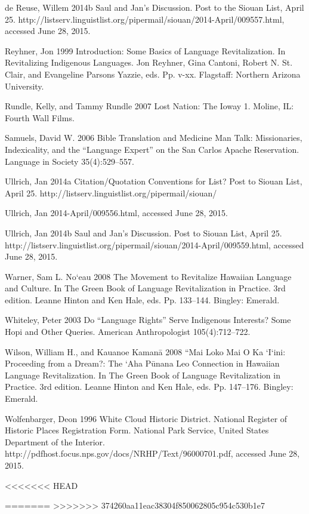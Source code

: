 \documentclass[output=paper]{LSP/langsci}
\begin{document}
\begin{reflist}
de Reuse, Willem 2014b Saul and Jan's Discussion. Post to the Siouan List, April 25. http://listserv.linguistlist.org/pipermail/siouan/2014-April/009557.html, accessed June 28, 2015.

Reyhner, Jon 1999 Introduction: Some Basics of Language Revitalization. In Revitalizing Indigenous Languages. Jon Reyhner, Gina Cantoni, Robert N. St. Clair, and Evangeline Parsons Yazzie, eds. Pp. v-xx. Flagstaff: Northern Arizona University.

Rundle, Kelly, and Tammy Rundle 2007 Lost Nation: The Ioway 1. Moline, IL: Fourth Wall Films.

Samuels, David W. 2006 Bible Translation and Medicine Man Talk: Missionaries, Indexicality, and the ``Language Expert'' on the San Carlos Apache Reservation. Language in Society 35(4):529--557.

Ullrich, Jan 2014a Citation/Quotation Conventions for List? Post to Siouan List, April 25. http://listserv.linguistlist.org/pipermail/siouan/

Ullrich, Jan 2014-April/009556.html, accessed June 28, 2015.

Ullrich, Jan 2014b Saul and Jan's Discussion. Post to Siouan List, April 25. http://listserv.linguistlist.org/pipermail/siouan/2014-April/009559.html, accessed June 28, 2015.

Warner, Sam L. No`eau 2008 The Movement to Revitalize Hawaiian Language and Culture. In The Green Book of Language Revitalization in Practice. 3rd edition. Leanne Hinton and Ken Hale, eds. Pp. 133--144. Bingley: Emerald.

Whiteley, Peter 2003 Do ``Language Rights'' Serve Indigenous Interests? Some Hopi and Other Queries. American Anthropologist 105(4):712--722.

Wilson, William H., and Kauanoe Kaman\=a 2008 ``Mai Loko Mai O Ka `I`ini: Proceeding from a Dream?: The `Aha P\=unana Leo Connection in Hawaiian Language Revitalization. In The Green Book of Language Revitalization in Practice. 3rd edition. Leanne Hinton and Ken Hale, eds. Pp. 147--176. Bingley: Emerald.

Wolfenbarger, Deon 1996 White Cloud Historic District. National Register of Historic Places Registration Form. National Park Service, United States Department of the Interior. http://pdfhost.focus.nps.gov/docs/NRHP/Text/96000701.pdf, accessed June 28, 2015.

\end{reflist}
<<<<<<< HEAD



=======
>>>>>>> 374260aa11eac38304f850062805c954c530b1e7
\end{document}
